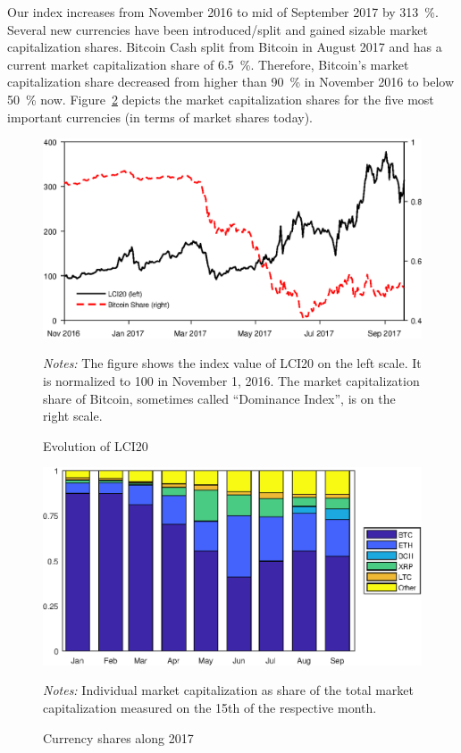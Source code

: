 \documentclass[11pt]{article}
\newcommand\fnotes[1]{\captionsetup{font=scriptsize}\caption*{\textsl{Notes:} #1}}
\begin{document}
Our index increases from November 2016 to mid of September 2017 by 313~\%.
Several new currencies have been introduced/split and gained sizable market capitalization shares.
Bitcoin Cash split from Bitcoin in August 2017 and has a current market capitalization share of 6.5~\%.
Therefore, Bitcoin's market capitalization share decreased from higher than 90~\% in November 2016 to below 50~\% now.
Figure~\ref{f:curshares} depicts the market capitalization shares for the five most important currencies (in terms of market shares today).

\begin{figure}[h]%
    \centering%
    \caption{Evolution of LCI20}\label{f:lci20}%
    \includegraphics[width=.8\textwidth]{figs/lci20.eps}%
    \medskip\newline%
    \fnotes{The figure shows the index value of LCI20 on the left scale. It is normalized to 100 in November 1, 2016. The market capitalization share of Bitcoin, sometimes called ``Dominance Index'', is on the right scale.}
\end{figure}

\begin{figure}[h]%
    \centering%
    \caption{Currency shares along 2017}\label{f:curshares}%
    \includegraphics[width=.8\textwidth]{figs/currency_shares.eps}%
    \medskip\newline%
    \fnotes{Individual market capitalization as share of the total market capitalization measured on the 15th of the respective month.}
\end{figure}
\end{document}
